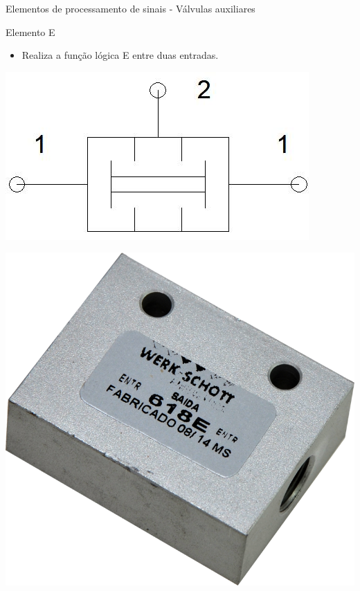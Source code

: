 \begin{frame}{Elementos de processamento de sinais - Válvulas auxiliares}
	\begin{block}{Elemento E}
		\begin{itemize}
			\item Realiza a função lógica E entre duas entradas.
		\end{itemize}
	\end{block}
	
	\medskip
	
	\begin{minipage}[c]{0.48\linewidth}
		\centering
		\includegraphics[width=1\linewidth]{Figuras/Ch14/fig25}
	\end{minipage}
	\hfill
	\begin{minipage}[c]{0.48\linewidth}
		\centering
		\includegraphics[width=1\linewidth]{Figuras/Ch14/fig26}
	\end{minipage}
\end{frame}


